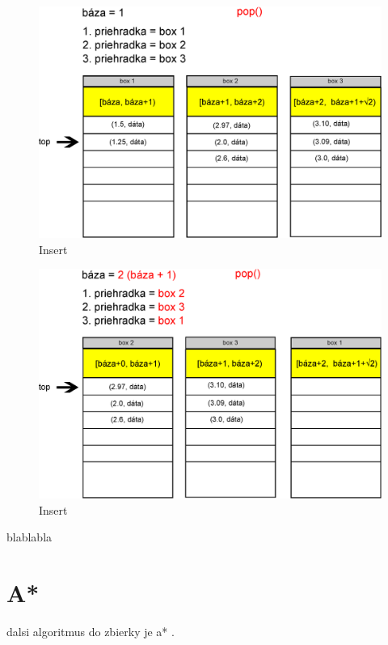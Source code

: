 \begin{figure}[h]
\centering
\includegraphics[width=\textwidth]{./img/priehradky_naplnene_default_i_d1.eps}
\caption{Insert}
\label{fig:priehradky_i_d1}
\end{figure}

\begin{figure}[h]
\centering
\includegraphics[width=\textwidth]{./img/priehradky_naplnene_default_i_d2.eps}
\caption{Insert}
\label{fig:priehradky_i_d2}
\end{figure}

blablabla


\section{A*}
dalsi algoritmus do zbierky je a* \cite{astar72}.
